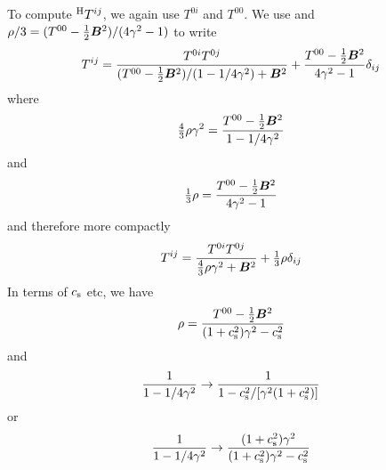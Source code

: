 \documentclass[twocolumn]{article}
\begin{document}
To compute $^{\rm H}T^{ij}$, we again use $T^{0i}$ and $T^{00}$.
We use  and $\rho/3=(T^{00}-{\textstyle{1\over2}}\bm{B}^2)/(4\gamma^2-1)$
to write
\begin{equation}
T^{ij}=\frac{T^{0i}T^{0j}}{(T^{00}-{\textstyle{1\over2}}\bm{B}^2)/(1-1/4\gamma^2)+\bm{B}^2}
+\frac{T^{00}-{\textstyle{1\over2}}\bm{B}^2}{4\gamma^2-1}\delta_{ij}
\end{equation}
where
\begin{equation}
{\textstyle{4\over3}}\rho\gamma^2=
\frac{T^{00}-{\textstyle{1\over2}}\bm{B}^2}{1-1/4\gamma^2}
\end{equation}
and
\begin{equation}
{\textstyle{1\over3}}\rho=
\frac{T^{00}-{\textstyle{1\over2}}\bm{B}^2}{4\gamma^2-1}
\end{equation}
and therefore more compactly
\begin{equation}
T^{ij}=\frac{T^{0i}T^{0j}}{{\textstyle{4\over3}}\rho\gamma^2+\bm{B}^2}
+{\textstyle{1\over3}}\rho\delta_{ij}
\label{hydroStress3}
\end{equation}
In terms of $c_{\rm s}$ etc, we have
\begin{equation}
\rho=\frac{T^{00}-{\textstyle{1\over2}}\bm{B}^2}{(1+c_{\rm s}^2)\gamma^2-c_{\rm s}^2}
\end{equation}
and
\begin{equation}
\frac{1}{1-1/4\gamma^2}\to
\frac{1}{1-c_{\rm s}^2/[\gamma^2(1+c_{\rm s}^2)]}
\end{equation}
or
\begin{equation}
\frac{1}{1-1/4\gamma^2}\to
\frac{(1+c_{\rm s}^2)\gamma^2}{(1+c_{\rm s}^2)\gamma^2-c_{\rm s}^2}
\end{equation}




\end{document}
